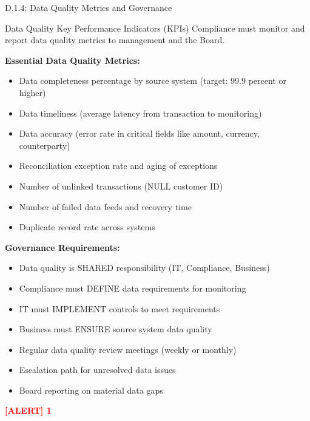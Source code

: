 \documentclass[11pt,a4paper]{beamer}
\newcommand{\redflag}[1]{\textcolor{red}{\textbf{[ALERT] 1}}}
\begin{document}
\begin{frame}{D.1.4: Data Quality Metrics and Governance}
	\begin{block}{Data Quality Key Performance Indicators (KPIs)}
		Compliance must monitor and report data quality metrics to management and the Board.
	\end{block}
	\textbf{Essential Data Quality Metrics:}
	\begin{itemize}
		\item Data completeness percentage by source system (target: 99.9 percent or higher)
		\item Data timeliness (average latency from transaction to monitoring)
		\item Data accuracy (error rate in critical fields like amount, currency, counterparty)
		\item Reconciliation exception rate and aging of exceptions
		\item Number of unlinked transactions (NULL customer ID)
		\item Number of failed data feeds and recovery time
		\item Duplicate record rate across systems
	\end{itemize}
	\textbf{Governance Requirements:}
	\begin{itemize}
		\item Data quality is SHARED responsibility (IT, Compliance, Business)
		\item Compliance must DEFINE data requirements for monitoring
		\item IT must IMPLEMENT controls to meet requirements
		\item Business must ENSURE source system data quality
		\item Regular data quality review meetings (weekly or monthly)
		\item Escalation path for unresolved data issues
		\item Board reporting on material data gaps
	\end{itemize}
	\redflag{Compliance cannot simply accept whatever data IT provides. Compliance must define requirements and monitor quality.}
\end{frame}

\end{document}
